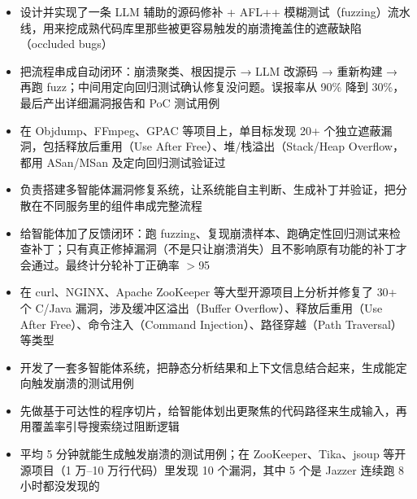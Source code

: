 \begin{itemize}
\item 设计并实现了一条 LLM 辅助的源码修补 + AFL++ 模糊测试（fuzzing）流水线，用来挖成熟代码库里那些被更容易触发的崩溃掩盖住的遮蔽缺陷（occluded bugs）
\item 把流程串成自动闭环：崩溃聚类、根因提示 → LLM 改源码 → 重新构建 → 再跑 fuzz；中间用定向回归测试确认修复没问题。误报率从 90\% 降到 30\%，最后产出详细漏洞报告和 PoC 测试用例
\item 在 Objdump、FFmpeg、GPAC 等项目上，单目标发现 20+ 个独立遮蔽漏洞，包括释放后重用（Use After Free）、堆/栈溢出（Stack/Heap Overflow，都用 ASan/MSan 及定向回归测试验证过
\end{itemize}

\begin{itemize}
\item 负责搭建多智能体漏洞修复系统，让系统能自主判断、生成补丁并验证，把分散在不同服务里的组件串成完整流程
\item 给智能体加了反馈闭环：跑 fuzzing、复现崩溃样本、跑确定性回归测试来检查补丁；只有真正修掉漏洞（不是只让崩溃消失）且不影响原有功能的补丁才会通过。最终计分轮补丁正确率 $>$95%
\item 在 curl、NGINX、Apache ZooKeeper 等大型开源项目上分析并修复了 30+ 个 C/Java 漏洞，涉及缓冲区溢出（Buffer Overflow）、释放后重用（Use After Free）、命令注入（Command Injection）、路径穿越（Path Traversal）等类型
\end{itemize}

\begin{itemize}
\item 开发了一套多智能体系统，把静态分析结果和上下文信息结合起来，生成能定向触发崩溃的测试用例
\item 先做基于可达性的程序切片，给智能体划出更聚焦的代码路径来生成输入，再用覆盖率引导搜索绕过阻断逻辑
\item 平均 5 分钟就能生成触发崩溃的测试用例；在 ZooKeeper、Tika、jsoup 等开源项目（1 万–10 万行代码）里发现 10 个漏洞，其中 5 个是 Jazzer 连续跑 8 小时都没发现的
\end{itemize}

